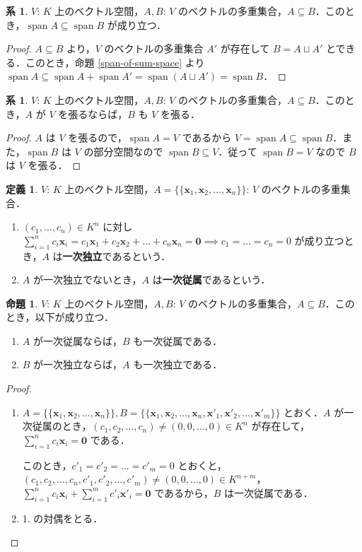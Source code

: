 \documentclass{jlreq}
\theoremstyle{definition}
\newtheorem{dfn}[thm]{定義}
\newtheorem{prop}[thm]{命題}
\newtheorem{cor}[thm]{系}
\DeclareMathOperator{\Span}{span}
\begin{document}
      \begin{cor}
        $V$: $K$ 上のベクトル空間，$A, B$: $V$ のベクトルの多重集合，$A \subseteq B$．このとき，$\Span A \subseteq \Span B$ が成り立つ．
      \end{cor}
      \begin{proof}
        $A \subseteq B$ より，$V$ のベクトルの多重集合 $A'$ が存在して $B = A \sqcup A'$ とできる．このとき，命題 \ref{span-of-sum-space} より $\Span A \subseteq \Span A + \Span A' = \Span (A \sqcup A') = \Span B$．
      \end{proof}
      \begin{cor}
        $V$: $K$ 上のベクトル空間，$A, B$: $V$ のベクトルの多重集合，$A \subseteq B$．このとき，$A$ が $V$ を張るならば，$B$ も $V$ を張る．
      \end{cor}
      \begin{proof}
        $A$ は $V$ を張るので，$\Span A = V$ であるから $V = \Span A \subseteq \Span B$．また，$\Span B$ は $V$ の部分空間なので $\Span B \subseteq V$．従って $\Span B = V$ なので $B$ は $V$ を張る．
      \end{proof}
      \begin{dfn}
        $V$: $K$ 上のベクトル空間，$A=\{\{\bm{x}_1, \bm{x}_2, \dots, \bm{x}_n\}\}$: $V$ のベクトルの多重集合．
        \begin{enumerate}
          \item $(c_1,\dots,c_n) \in K^n$ に対し $\sum_{i=1}^n c_i\bm{x}_i = c_1\bm{x}_1 + c_2\bm{x}_2 + \dots + c_n\bm{x}_n = \bm{0} \implies c_1 = \dots = c_n = 0$ が成り立つとき，$A$ は\textbf{一次独立}であるという．
          \item $A$ が一次独立でないとき，$A$ は\textbf{一次従属}であるという．
        \end{enumerate}
      \end{dfn}
      \begin{prop}
        $V$: $K$ 上のベクトル空間，$A, B$: $V$ のベクトルの多重集合，$A \subseteq B$．このとき，以下が成り立つ．
        \begin{enumerate}
          \item $A$ が一次従属ならば，$B$ も一次従属である．
          \item $B$ が一次独立ならば，$A$ も一次独立である．
        \end{enumerate}
      \end{prop}
      \begin{proof}
        \mbox{}
        \begin{enumerate}
          \item $A=\{\{\bm{x}_1, \bm{x}_2, \dots, \bm{x}_n\}\}, B=\{\{\bm{x}_1, \bm{x}_2, \dots, \bm{x}_n, \bm{x}'_1, \bm{x}'_2, \dots, \bm{x}'_m\}\}$ とおく．$A$ が一次従属のとき，$(c_1,c_2,\dots,c_n) \neq (0,0,\dots,0) \in K^n$ が存在して，$\sum_{i=1}^nc_i\bm{x}_i = \bm{0}$ である．
          
          このとき，$c'_1=c'_2=\dots=c'_m=0$ とおくと，$(c_1,c_2,\dots,c_n,c'_1,c'_2,\dots,c'_m) \neq (0,0,\dots,0) \in K^{n+m}$，$\sum_{i=1}^nc_i\bm{x}_i+\sum_{i=1}^mc'_i\bm{x}'_i=\bm{0}$ であるから，$B$ は一次従属である．
          \item 1. の対偶をとる．
        \end{enumerate}
      \end{proof}
\end{document}

